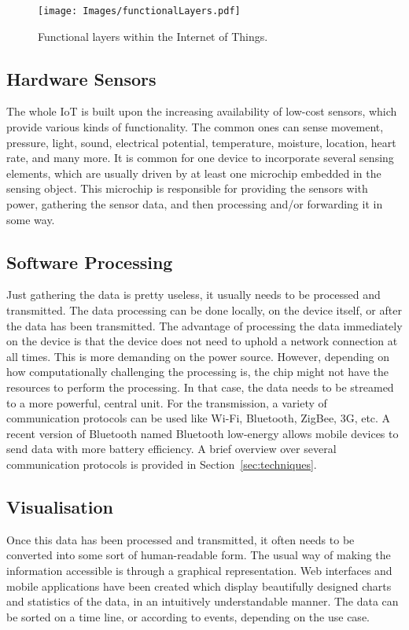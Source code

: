 \begin{figure}[!t]
\centering
\texttt{[image: Images/functionalLayers.pdf]}
\caption{Functional layers within the Internet of Things.}
\label{fig:functionalLayers}
\end{figure}

\subsection{Hardware Sensors}
\label{sec:hardwareSensors}
The whole IoT is built upon the increasing availability of low-cost sensors, which provide various kinds of functionality.
The common ones can sense movement, pressure, light, sound, electrical potential, temperature, moisture, location, heart rate, and many more.
It is common for one device to incorporate several sensing elements, which are usually driven by at least one microchip embedded in the sensing object.
This microchip is responsible for providing the sensors with power, gathering the sensor data, and then processing and/or forwarding it in some way.

\subsection{Software Processing} 
\label{sec:softwareProcessing}
Just gathering the data is pretty useless, it usually needs to be processed and transmitted. 
The data processing can be done locally, on the device itself, or after the data has been transmitted. 
The advantage of processing the data immediately on the device is that the device does not need to uphold a network connection at all times. 
This is more demanding on the power source. 
However, depending on how computationally challenging the processing is, the chip might not have the resources to perform the processing. 
In that case, the data needs to be streamed to a more powerful, central unit. 
For the transmission, a variety of communication protocols can be used like Wi-Fi, Bluetooth, ZigBee, 3G, etc. 
A recent version of Bluetooth named Bluetooth low-energy allows mobile devices to send data with more battery efficiency. A brief overview over several communication protocols is provided in Section~\ref{sec:techniques}.

\subsection{Visualisation}
\label{sec:visualisation}
Once this data has been processed and transmitted, it often needs to be converted into some sort of human-readable form. The usual way of making the information accessible is through a graphical representation. 
Web interfaces and mobile applications have been created which display beautifully designed charts and statistics of the data, in an intuitively understandable manner. 
The data can be sorted on a time line, or according to events, depending on the use case.

